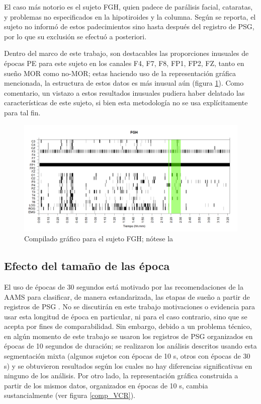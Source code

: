 \documentclass[12pt,a4paper]{mitthesis}
\begin{document}
El caso m\'as notorio es el sujeto FGH, quien padece de par\'alisis facial, cataratas, y problemas 
no especificados en la hipotiroides y la columna. Seg\'un se reporta, el sujeto no inform\'o de 
estos padecimientos sino hasta despu\'es del registro de PSG, por lo que su exclusi\'on se efectu\'o 
a posteriori.

Dentro del marco de este trabajo, son destacables las proporciones inusuales de \'epocas PE para 
este sujeto en los canales F4, F7, F8, FP1, FP2, FZ, tanto en sue\~no MOR como no-MOR; estas 
haciendo uso de la representaci\'on gr\'afica mencionada, la estructura de estos datos es m\'as
inusual a\'un (figura \ref{FGH_especial}).
Como comentario, un vistazo a estos resultados inusuales pudiera haber delatado las 
caracter\'isticas de este sujeto, si bien esta metodolog\'ia no se usa expl\'icitamente para tal 
fin.

\begin{figure}
\centering
\includegraphics[width=0.95\linewidth]
{./muypreeliminar170408/FGHSUE_est.png} 
\caption{Compilado gr\'afico para el sujeto FGH; n\'otese la }
\label{FGH_especial}
\end{figure}


\subsection{Efecto del tama\~no de las \'epoca}

El uso de \'epocas de 30 segundos est\'a motivado por las recomendaciones de la AAMS para 
clasificar, de manera estandarizada, las etapas de sue\~no a partir de registros de PSG 
\cite{AASM07}. 
No se discutir\'an en este trabajo motivaciones o evidencia para usar esta longitud de \'epoca en 
particular, ni para el caso contrario, sino que se acepta por fines de comparabilidad. 
Sin embargo, debido a un problema t\'ecnico, en alg\'un momento de este trabajo se usaron los 
registros de PSG organizados en \'epocas de 10 segundos de duraci\'on; se realizaron los an\'alisis 
descritos usando esta segmentaci\'on mixta (algunos sujetos con \'epocas de 10 s, otros con 
\'epocas de 30 s) y se obtuvieron resultados seg\'un los cuales no hay diferencias significativas 
en ninguno de los an\'alisis. 
Por otro lado, la representaci\'on gr\'afica construida a partir de los mismos datos, organizados
en \'epocas de 10 s, cambia sustancialmente (ver figura \ref{comp_VCR}).
\end{document}
